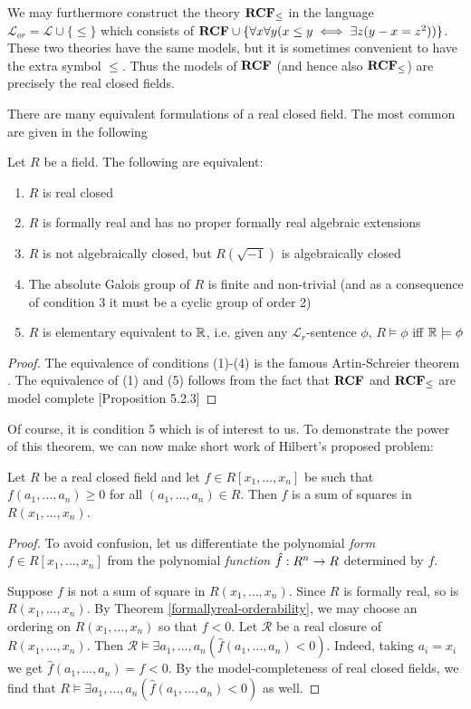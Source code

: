 We may furthermore construct the theory ${\normalfont\textbf{RCF}}_{\leq}$ in the language $\mathcal{L}_{or}=\mathcal{L}\cup \{\leq\}$ which consists of ${\normalfont\textbf{RCF}}\cup\{\forall x\forall y (x\leq y \iff \exists z (y-x=z^2) ) \}$. These two theories have the same models, but it is sometimes convenient to have the extra symbol $\leq$. Thus the models of ${\normalfont\textbf{RCF}}$ (and hence also ${\normalfont\textbf{RCF}}_{\leq}$) are precisely the real closed fields.

There are many equivalent formulations of a real closed field. The most common are given in the following

\begin{theorem}
\label{artin-schreier}
Let $R$ be a field. The following are equivalent:
	\begin{enumerate}
		\item $R$ is real closed
		\item $R$ is formally real and has no proper formally real algebraic extensions
		\item $R$ is not algebraically closed, but $R(\sqrt{-1})$ is algebraically closed
		\item The absolute Galois group of $R$ is finite and non-trivial (and as a consequence of condition 3 it must be a cyclic group of order 2)
		\item $R$ is elementary equivalent to $\mathbb{R}$, i.e. given any $\mathcal{L}_r$-sentence $\phi$, $R\models\phi$ iff $\mathbb{R}\models \phi$
	\end{enumerate}
\end{theorem}
\begin{proof}
The equivalence of conditions (1)-(4) is the famous Artin-Schreier theorem \cite{artin1927algebraische}. The equivalence of (1) and (5) follows from the fact that ${\normalfont\textbf{RCF}}$ and ${\normalfont\textbf{RCF}}_{\leq}$ are model complete \cite{real}[Proposition 5.2.3]
\end{proof}

Of course, it is condition 5 which is of interest to us. To demonstrate the power of this theorem, we can now make short work of Hilbert's proposed problem: 
\begin{theorem}
\label{hilberts17th}
Let $R$ be a real closed field and let $f\in R[x_1,\dots, x_n]$ be such that $f(a_1,\dots, a_n)\geq 0$ for all $(a_1,\dots, a_n)\in R$. Then $f$ is a sum of squares in $R(x_1,\dots, x_n)$.
\end{theorem}
\begin{proof}
To avoid confusion, let us differentiate the polynomial \emph{form} $f\in R[x_1,\dots, x_n]$ from the polynomial \emph{function} $\hat{f}:R^n\rightarrow R$ determined by $f$.

\noindent Suppose $f$ is not a sum of square in $R(x_1,\dots, x_n)$. Since $R$ is formally real, so is $R(x_1,\dots, x_n)$. By Theorem \ref{formallyreal-orderability}, we may choose an ordering on $R(x_1,\dots, x_n)$ so that $f<0$. Let $\mathcal{R}$ be a real closure of $R(x_1,\dots, x_n)$. Then $\mathcal{R}\models \exists a_1,\dots, a_n (\hat{f}(a_1,\dots, a_n)<0)$. Indeed, taking $a_i=x_i$ we get $\hat{f}(a_1,\dots, a_n)=f<0$. 
By the model-completeness of real closed fields, we find that $R\models \exists a_1,\dots, a_n (\hat{f}(a_1,\dots, a_n)<0)$ as well.
\end{proof}

